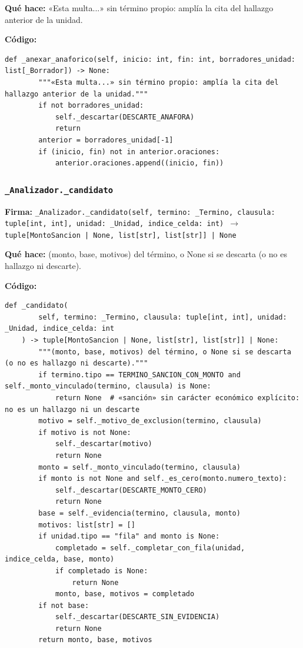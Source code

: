 \documentclass[11pt,a4paper]{article}
\begin{document}
\textbf{Qué hace:} «Esta multa...» sin término propio: amplía la cita del hallazgo anterior de la unidad.

\textbf{Código:}
\begin{lstlisting}
def _anexar_anaforico(self, inicio: int, fin: int, borradores_unidad: list[_Borrador]) -> None:
        """«Esta multa...» sin término propio: amplía la cita del hallazgo anterior de la unidad."""
        if not borradores_unidad:
            self._descartar(DESCARTE_ANAFORA)
            return
        anterior = borradores_unidad[-1]
        if (inicio, fin) not in anterior.oraciones:
            anterior.oraciones.append((inicio, fin))
\end{lstlisting}

\subsubsection*{\texttt{\_Analizador.\_candidato}}
\textbf{Firma:} \texttt{\_Analizador.\_candidato(self, termino: \_Termino, clausula: tuple[int, int], unidad: \_Unidad, indice\_celda: int) $\rightarrow$ tuple[MontoSancion | None, list[str], list[str]] | None}

\textbf{Qué hace:} (monto, base, motivos) del término, o None si se descarta (o no es hallazgo ni descarte).

\textbf{Código:}
\begin{lstlisting}
def _candidato(
        self, termino: _Termino, clausula: tuple[int, int], unidad: _Unidad, indice_celda: int
    ) -> tuple[MontoSancion | None, list[str], list[str]] | None:
        """(monto, base, motivos) del término, o None si se descarta (o no es hallazgo ni descarte)."""
        if termino.tipo == TERMINO_SANCION_CON_MONTO and self._monto_vinculado(termino, clausula) is None:
            return None  # «sanción» sin carácter económico explícito: no es un hallazgo ni un descarte
        motivo = self._motivo_de_exclusion(termino, clausula)
        if motivo is not None:
            self._descartar(motivo)
            return None
        monto = self._monto_vinculado(termino, clausula)
        if monto is not None and self._es_cero(monto.numero_texto):
            self._descartar(DESCARTE_MONTO_CERO)
            return None
        base = self._evidencia(termino, clausula, monto)
        motivos: list[str] = []
        if unidad.tipo == "fila" and monto is None:
            completado = self._completar_con_fila(unidad, indice_celda, base, monto)
            if completado is None:
                return None
            monto, base, motivos = completado
        if not base:
            self._descartar(DESCARTE_SIN_EVIDENCIA)
            return None
        return monto, base, motivos
\end{lstlisting}
\end{document}
